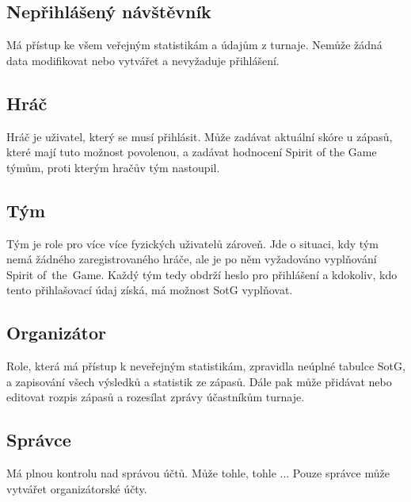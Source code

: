 \documentclass[thesis=B,czech]{FITthesis}[2012/06/26]
\begin{document}

\subsection{Nepřihlášený návštěvník}

\indent

Má přístup ke všem veřejným statistikám a údajům z turnaje. Nemůže žádná data modifikovat
nebo vytvářet a nevyžaduje přihlášení.

\subsection{Hráč}


\indent

Hráč je uživatel, který se musí přihlásit. Může zadávat aktuální skóre u zápasů,
které mají tuto možnost povolenou, a zadávat hodnocení Spirit of the Game týmům, proti kterým hračův tým nastoupil.

\subsection{Tým}

\indent

Tým je role pro více více fyzických uživatelů zároveň. Jde o situaci, kdy tým nemá žádného zaregistrovaného hráče,
ale je po něm vyžadováno vyplňování Spirit of~the~Game. Každý tým tedy obdrží heslo pro přihlášení a kdokoliv,
kdo tento přihlašovací údaj získá, má možnost SotG vyplňovat.

\subsection{Organizátor}

\indent

Role, která má přístup k neveřejným statistikám, zpravidla neúplné tabulce SotG, a zapisování všech výsledků a statistik ze zápasů.
Dále pak může přidávat nebo editovat rozpis zápasů a rozesílat zprávy účastníkům turnaje.

\subsection{Správce}

\indent

Má plnou kontrolu nad správou účtů. Může tohle, tohle ... Pouze správce může vytvářet organizátorské účty.
\end{document}
